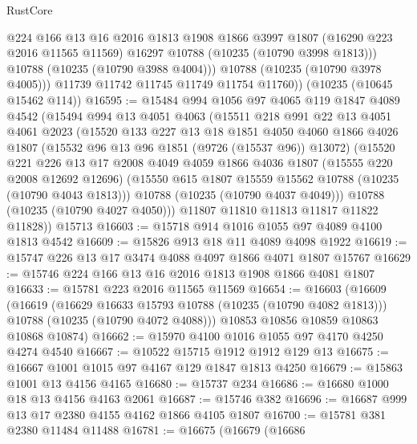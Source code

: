 \begin{lexlean}{RustCore}
\begin{coremodule}
              @224
              @166
              @13
              @16
              @2016
              @1813
              @1908
              @1866
              @3997
              @1807
              (@16290 @223 @2016 @11565 @11569)
              @16297
              @10788
              (@10235 (@10790 @3998 @1813)))
            @10788
            (@10235 (@10790 @3988 @4004)))
          @10788
          (@10235 (@10790 @3978 @4005)))
        @11739
        @11742
        @11745
        @11749
        @11754
        @11760))
    (@10235 (@10645 @15462 @114))
@16595 := @15484
    @994
    @1056
    @97
    @4065
    @119
    @1847
    @4089
    @4542
    (@15494
      @994
      @13
      @4051
      @4063
      (@15511
        @218
        @991
        @22
        @13
        @4051
        @4061
        @2023
        (@15520
          @133
          @227
          @13
          @18
          @1851
          @4050
          @4060
          @1866
          @4026
          @1807
          (@15532 @96 @13 @96 @1851 (@9726 (@15537 @96)) @13072)
          (@15520
            @221
            @226
            @13
            @17
            @2008
            @4049
            @4059
            @1866
            @4036
            @1807
            (@15555 @220 @2008 @12692 @12696)
            (@15550 @615 @1807 @15559 @15562 @10788 (@10235 (@10790 @4043 @1813)))
            @10788
            (@10235 (@10790 @4037 @4049)))
          @10788
          (@10235 (@10790 @4027 @4050)))
        @11807
        @11810
        @11813
        @11817
        @11822
        @11828))
    @15713
@16603 := @15718 @914 @1016 @1055 @97 @4089 @4100 @1813 @4542
@16609 := @15826 @913 @18 @11 @4089 @4098 @1922
@16619 := @15747 @226 @13 @17 @3474 @4088 @4097 @1866 @4071 @1807 @15767
@16629 := @15746 @224 @166 @13 @16 @2016 @1813 @1908 @1866 @4081 @1807
@16633 := @15781 @223 @2016 @11565 @11569
@16654 := @16603
    (@16609
      (@16619
        (@16629 @16633 @15793 @10788 (@10235 (@10790 @4082 @1813)))
        @10788
        (@10235 (@10790 @4072 @4088)))
      @10853
      @10856
      @10859
      @10863
      @10868
      @10874)
@16662 := @15970 @4100 @1016 @1055 @97 @4170 @4250 @4274 @4540
@16667 := @10522 @15715 @1912 @1912 @129 @13
@16675 := @16667 @1001 @1015 @97 @4167 @129 @1847 @1813 @4250
@16679 := @15863 @1001 @13 @4156 @4165
@16680 := @15737 @234
@16686 := @16680 @1000 @18 @13 @4156 @4163 @2061
@16687 := @15746 @382
@16696 := @16687 @999 @13 @17 @2380 @4155 @4162 @1866 @4105 @1807
@16700 := @15781 @381 @2380 @11484 @11488
@16781 := @16675
    (@16679
      (@16686

\end{coremodule}
\end{lexlean}
